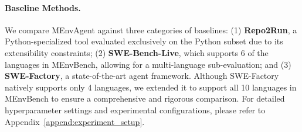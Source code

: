 \documentclass{article}
\theoremstyle{plain}
\theoremstyle{definition}
\theoremstyle{remark}
\begin{document}
\paragraph{Baseline Methods.}
We compare MEnvAgent against three categories of baselines: 
(1) \textbf{Repo2Run}\cite{hu_repo2run_2025}, a Python-specialized tool evaluated exclusively on the Python subset due to its extensibility constraints; 
(2) \textbf{SWE-Bench-Live}\cite{zhang_swe-bench_2025}, which supports 6 of the languages in MEnvBench, allowing for a multi-language sub-evaluation; 
and (3) \textbf{SWE-Factory}\cite{guo_swe-factory_2025}, a state-of-the-art agent framework. Although SWE-Factory natively supports only 4 languages, we extended it to support all 10 languages in MEnvBench to ensure a comprehensive and rigorous comparison. For detailed hyperparameter settings and experimental configurations, please refer to Appendix~\ref{append:experiment_setup}.
\begin{table}[t]
    \centering
    \caption{Averaged performance comparison across 10 languages. The values in parentheses indicate the improvement over the SWE-Factory baseline. 
    }
    \label{tab:performance_improvement_mixed}
\end{table}
\end{document}
